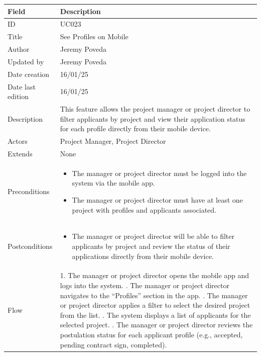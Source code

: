 \documentclass{scrreprt}
\begin{document}
\begin{table}[H]
	\centering
	\begin{tabular}{|p{3cm}|p{10cm}|}
		\hline
		\textbf{Field} & \textbf{Description} \\ \hline
		ID & UC023 \\ \hline
		Title & See Profiles on Mobile \\ \hline
		Author & Jeremy Poveda \\ \hline
		Updated by & Jeremy Poveda \\ \hline
		Date creation & 16/01/25 \\ \hline
		Date last edition & 16/01/25 \\ \hline
		Description & 
		This feature allows the project manager or project director to filter applicants by project and view their application status for each profile directly from their mobile device. \\ \hline
		Actors & Project Manager, Project Director \\ \hline
		Extends & None \\ \hline
		Preconditions & 
		\begin{itemize}
			\item The manager or project director must be logged into the system via the mobile app.
			\item The manager or project director must have at least one project with profiles and applicants associated.
		\end{itemize} \\ \hline
		Postconditions & 
		\begin{itemize}
			\item The manager or project director will be able to filter applicants by project and review the status of their applications directly from their mobile device.
		\end{itemize} \\ \hline
		Flow & 
		1. The manager or project director opens the mobile app and logs into the system. \newline
		2. The manager or project director navigates to the “Profiles” section in the app. \newline
		3. The manager or project director applies a filter to select the desired project from the list. \newline
		4. The system displays a list of applicants for the selected project. \newline
		5. The manager or project director reviews the postulation status for each applicant profile (e.g., accepted, pending contract sign, completed). \\ \hline

\end{tabular}
\end{table}
\end{document}
